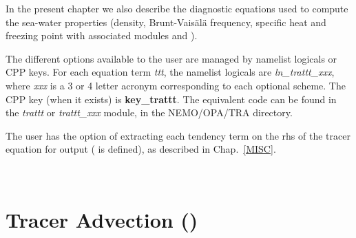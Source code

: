 In the present chapter we also describe the diagnostic equations used to compute 
the sea-water properties (density, Brunt-Vais\"{a}l\"{a} frequency, specific heat and 
freezing point with associated modules  and ).

The different options available to the user are managed by namelist logicals or 
CPP keys. For each equation term \textit{ttt}, the namelist logicals are \textit{ln\_trattt\_xxx}, 
where \textit{xxx} is a 3 or 4 letter acronym corresponding to each optional scheme. 
The CPP key (when it exists) is \textbf{key\_trattt}. The equivalent code can be 
found in the \textit{trattt} or \textit{trattt\_xxx} module, in the NEMO/OPA/TRA directory.

The user has the option of extracting each tendency term on the rhs of the tracer 
equation for output ( is defined), as described in Chap.~\ref{MISC}.

$\ $\newline    %
\section  [Tracer Advection (\textit{traadv})]
		{Tracer Advection ()}
\label{TRA_adv}

